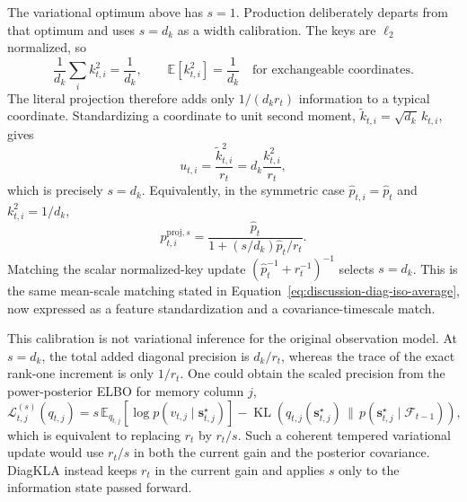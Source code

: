 \documentclass[11pt]{article}
\newcommand{\vct}[1]{\boldsymbol{#1}}
\begin{document}
The variational optimum above has $s=1$. Production deliberately departs from that optimum and
uses $s=d_k$ as a width calibration. The keys are $\ell_2$ normalized, so
\begin{equation}
  \frac{1}{d_k}\sum_i k_{t,i}^2=\frac{1}{d_k},
  \qquad
  \mathbb{E}[k_{t,i}^2]=\frac{1}{d_k}
  \quad\text{for exchangeable coordinates}.
  \label{eq:discussion-normalized-key-coordinate-scale}
\end{equation}
The literal projection therefore adds only $1/(d_kr_t)$ information to a typical coordinate.
Standardizing a coordinate to unit second moment,
$\widetilde k_{t,i}=\sqrt{d_k}\,k_{t,i}$, gives
\begin{equation}
  u_{t,i}=\frac{\widetilde k_{t,i}^2}{r_t}
  =d_k\frac{k_{t,i}^2}{r_t},
  \label{eq:discussion-standardized-coordinate-update}
\end{equation}
which is precisely $s=d_k$. Equivalently, in the symmetric case
$\widehat p_{t,i}=\widehat p_t$ and $k_{t,i}^2=1/d_k$,
\begin{equation}
  p^{\mathrm{proj},s}_{t,i}
  =\frac{\widehat p_t}{1+(s/d_k)\widehat p_t/r_t}.
  \label{eq:discussion-symmetric-projected-scale}
\end{equation}
Matching the scalar normalized-key update
$(\widehat p_t^{-1}+r_t^{-1})^{-1}$ selects $s=d_k$. This is the same mean-scale matching stated
in Equation~\eqref{eq:discussion-diag-iso-average}, now expressed as a feature standardization and
a covariance-timescale match.

This calibration is not variational inference for the original observation model. At $s=d_k$,
the total added diagonal precision is $d_k/r_t$, whereas the trace of the exact rank-one increment
is only $1/r_t$. One could obtain the scaled precision from the power-posterior ELBO for memory
column $j$,
\begin{equation}
  \mathcal{L}_{t,j}^{(s)}(q_{t,j})
  =s\,\mathbb{E}_{q_{t,j}}\!\left[
    \log p(v_{t,j}\mid\vct{s}_{t,j}^\star)
  \right]
  -\operatorname{KL}\!\left(
    q_{t,j}(\vct{s}_{t,j}^\star)\,\|\,
    p(\vct{s}_{t,j}^\star\mid\mathcal{F}_{t-1})
  \right),
  \label{eq:discussion-power-posterior-elbo}
\end{equation}
which is equivalent to replacing $r_t$ by $r_t/s$. Such a coherent tempered variational update
would use $r_t/s$ in both the current gain and the posterior covariance. DiagKLA instead keeps
$r_t$ in the current gain and applies $s$ only to the information state passed forward.
\end{document}
